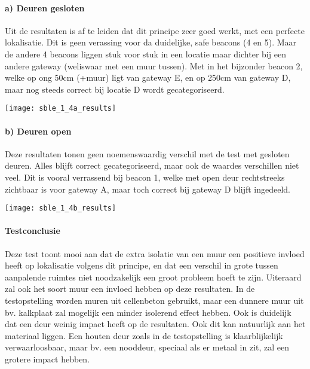 \paragraph{a) Deuren gesloten}
\begin{minipage}{0.55\textwidth}
Uit de resultaten is af te leiden dat dit principe zeer goed werkt, met een perfecte lokalisatie. Dit is geen verassing voor da duidelijke, safe beacons (4 en 5). Maar de andere 4 beacons liggen stuk voor stuk in een locatie maar dichter bij een andere gateway (weliswaar met een muur tussen). Met in het bijzonder beacon 2, welke op ong 50cm (+muur) ligt van gateway E, en op 250cm van gateway D, maar nog steeds correct bij locatie D wordt gecategoriseerd.
\end{minipage}
\hfill
\begin{minipage}{0.42\textwidth}
	\texttt{[image: sble\_1\_4a\_results]}
\end{minipage}

\paragraph{b) Deuren open}
\begin{minipage}{0.55\textwidth}
Deze resultaten tonen geen noemenswaardig verschil met de test met gesloten deuren. Alles blijft correct gecategoriseerd, maar ook de waardes verschillen niet veel. Dit is vooral verrassend bij beacon 1, welke met open deur rechtstreeks zichtbaar is voor gateway A, maar toch correct bij gateway D blijft ingedeeld.
\end{minipage}
\hfill
\begin{minipage}{0.42\textwidth}
	\texttt{[image: sble\_1\_4b\_results]}
\end{minipage}
\paragraph{Testconclusie}
Deze test toont mooi aan dat de extra isolatie van een muur een positieve invloed heeft op lokalisatie volgens dit principe, en dat een verschil in grote tussen aanpalende ruimtes niet noodzakelijk een groot probleem hoeft te zijn. Uiteraard zal ook het soort muur een invloed hebben op deze resultaten. In de testopstelling worden muren uit cellenbeton gebruikt, maar een dunnere muur uit bv. kalkplaat zal mogelijk een minder isolerend effect hebben. Ook is duidelijk dat een deur weinig impact heeft op de resultaten. Ook dit kan natuurlijk aan het materiaal liggen. Een houten deur zoals in de testopstelling is klaarblijkelijk verwaarloosbaar, maar bv. een nooddeur, speciaal als er metaal in zit, zal een grotere impact hebben.

